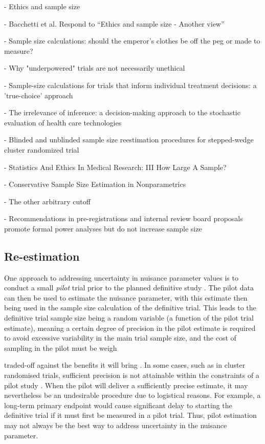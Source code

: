 \documentclass[sagev, Crown]{sagej}
\begin{document}
\cite{Bacchetti2005a} - Ethics and sample size

\cite{Bacchetti2005} - Bacchetti et al. Respond to ``Ethics and sample size - Another view''

\cite{Norman2012} - Sample size calculations: should the emperor's clothes be off the peg or made to measure?

\cite{Edwards1997} - Why "underpowered" trials are not necessarily unethical

\cite{Girling2007} - Sample-size calculations for trials that inform individual treatment decisions: a 'true-choice' approach

\cite{Claxton1999} - The irrelevance of inference: a decision-making approach to the stochastic evaluation of health care technologies

\cite{Grayling2018} - Blinded and unblinded sample size reestimation procedures for stepped-wedge cluster randomized trial

\cite{Altman1980} - Statistics And Ethics In Medical Research: III How Large A Sample?

\cite{DeMartini2010} - Conservative Sample Size Estimation in Nonparametrics

\cite{Bacchetti2019} - The other arbitrary cutoff

\cite{Bakker2020} - Recommendations in pre-registrations and internal review board proposals promote formal power analyses but do not increase sample size

\subsection{Re-estimation}

One approach to addressing uncertainty in nuisance parameter values is to conduct a small \emph{pilot} trial prior to the planned definitive study \cite{Browne1995, Gould2001, Friede2006}. The pilot data can then be used to estimate the nuisance parameter, with this estimate then being used in the sample size calculation of the definitive trial. This leads to the definitive trial sample size being a random variable (a function of the pilot trial estimate),  meaning a certain degree of precision in the pilot estimate is required to avoid excessive variability in the main trial sample size, and the cost of sampling in the pilot must be weigh

traded-off against the benefits it will bring \cite{Teare2014, Whitehead2015}. In some cases, such as in cluster randomised trials, sufficient precision is not attainable within the constraints of a pilot study \cite{Lake2002, Eldridge2015}. When the pilot will deliver a sufficiently  precise estimate, it may nevertheless be an undesirable procedure due to logistical reasons. For example, a long-term primary endpoint would cause significant delay to starting the definitive trial if it must first be measured in a pilot trial. Thus, pilot estimation may not always be the best way to address uncertainty in the nuisance parameter.
\end{document}
